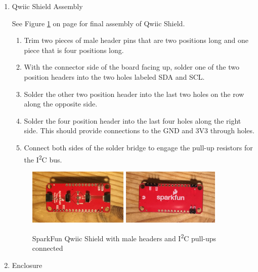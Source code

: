 \documentclass[11pt, letterpaper]{article}
\begin{document}
\begin{enumerate}

\item
Qwiic Shield Assembly

See Figure \ref{fig:qwiic} on page \pageref{fig:qwiic} for final assembly of Qwiic Shield.

\begin{enumerate}[label=1.\arabic*]
\item
Trim two pieces of male header pins that are two positions long and one piece that is four positions long.
\item
With the connector side of the board facing up, solder one of the two position headers into the two holes labeled SDA and SCL.
\item
Solder the other two position header into the last two holes on the row along the opposite side.
\item
Solder the four position header into the last four holes along the right side. This should provide connections to the GND and 3V3 through holes.
\item
Connect both sides of the solder bridge to engage the pull-up resistors for the I\textsuperscript{2}C bus.
\end{enumerate}

\begin{figure}[H]
\centering
\includegraphics[width=0.45\textwidth]{images/qwiic_top.JPG}
\includegraphics[width=0.44\textwidth]{images/qwiic_bottom.JPG}
\caption{SparkFun Qwiic Shield with male headers and I\textsuperscript{2}C pull-ups connected}
\label{fig:qwiic}
\end{figure}

\item \label{itm:enclosure}
Enclosure


\end{enumerate}
\end{document}
